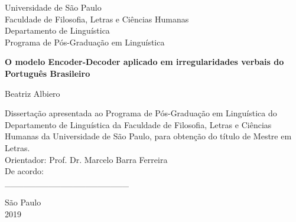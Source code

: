\thispagestyle{empty}

\begin{center}
    Universidade de São Paulo\\
    Faculdade de Filosofia, Letras e Ciências Humanas\\
    Departamento de Linguística\\
    Programa de Pós-Graduação em Linguística 
\end{center}
\begin{center}
    \vspace*{1.3cm}
    \textbf{\Large{O modelo Encoder-Decoder aplicado em irregularidades verbais do Português Brasileiro
}}\\
\end{center}
\vspace{1.0 cm}

\begin{center}
\Large{Beatriz Albiero}
\end{center}

\vspace*{4cm}  
\hfill\begin{minipage}{0.5\linewidth}
  Dissertação apresentada ao Programa de Pós-Graduação em Linguística do Departamento de Linguística da Faculdade de Filosofia, Letras e Ciências Humanas da Universidade de São Paulo, para obtenção do título de Mestre em Letras. \\
   
  Orientador: Prof. Dr. Marcelo Barra Ferreira\\
  
  De acordo:\\
  
\_\_\_\_\_\_\_\_\_\_\_\_\_\_\_\_\_\_\_\_
  
 
\end{minipage}

 \begin{center}   
    \vskip 4.5cm
    \normalsize{São Paulo\\ 2019}
\end{center}